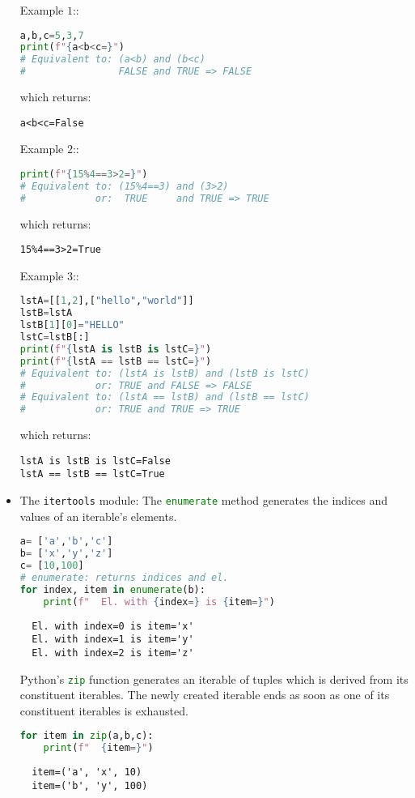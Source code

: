 \documentclass[10pt]{article}
\begin{document}
\begin{itemize}
Example $1$::
\begin{lstlisting}[language=python]
a,b,c=5,3,7
print(f"{a<b<c=}")
# Equivalent to: (a<b) and (b<c)
#                FALSE and TRUE => FALSE
\end{lstlisting}
which returns:
\begin{verbatim}
a<b<c=False
\end{verbatim}


Example $2$::
\begin{lstlisting}[language=python]
print(f"{15%4==3>2=}")
# Equivalent to: (15%4==3) and (3>2)
#            or:  TRUE     and TRUE => TRUE
\end{lstlisting}
which returns:
\begin{verbatim}
15%4==3>2=True
\end{verbatim}


Example $3$::
\begin{lstlisting}[language=python]
lstA=[[1,2],["hello","world"]]
lstB=lstA
lstB[1][0]="HELLO"
lstC=lstB[:]
print(f"{lstA is lstB is lstC=}")
print(f"{lstA == lstB == lstC=}")
# Equivalent to: (lstA is lstB) and (lstB is lstC)
#            or: TRUE and FALSE => FALSE
# Equivalent to: (lstA == lstB) and (lstB == lstC)
#            or: TRUE and TRUE => TRUE
\end{lstlisting}
which returns:
\begin{verbatim}
lstA is lstB is lstC=False
lstA == lstB == lstC=True
\end{verbatim}

\item The \lstinline[language=python]{itertools} module:\newline
The \lstinline[language=python]{enumerate} method generates the indices and values of an iterable's elements.
\begin{lstlisting}[language=python]
a= ['a','b','c']
b= ['x','y','z']
c= [10,100]
# enumerate: returns indices and el.
for index, item in enumerate(b):
    print(f"  El. with {index=} is {item=}")
\end{lstlisting}
\begin{verbatim}
  El. with index=0 is item='x'
  El. with index=1 is item='y'
  El. with index=2 is item='z'
\end{verbatim} 

Python's \lstinline[language=python]{zip} function generates an iterable of tuples
which is derived from its constituent iterables. The newly created iterable ends as soon as
one of its constituent iterables is exhausted.
\begin{lstlisting}[language=python]
for item in zip(a,b,c):
    print(f"  {item=}")
\end{lstlisting}
\begin{verbatim} 
  item=('a', 'x', 10)
  item=('b', 'y', 100)
\end{verbatim}


\end{itemize}
\end{document}
